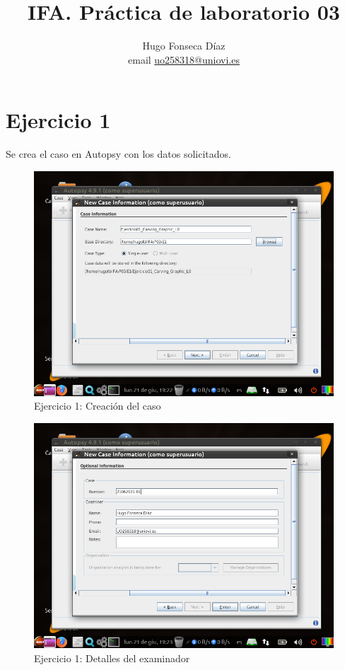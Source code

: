 \documentclass[11pt]{article}
\begin{document}
\title{IFA. Práctica de laboratorio 03}

\author{Hugo Fonseca Díaz \\ email \href{mailto:uo258318@uniovi.es}{uo258318@uniovi.es}}

\maketitle

\section{Ejercicio 1}
Se crea el caso en Autopsy con los datos solicitados.

\begin{figure}[H]
    \caption{Ejercicio 1: Creación del caso}
    \centering
    \includegraphics[scale=0.7]{e1-1.png}
\end{figure}

\begin{figure}[H]
    \caption{Ejercicio 1: Detalles del examinador}
    \centering
    \includegraphics[scale=0.7]{e1-2.png}
\end{figure}
\end{document}

